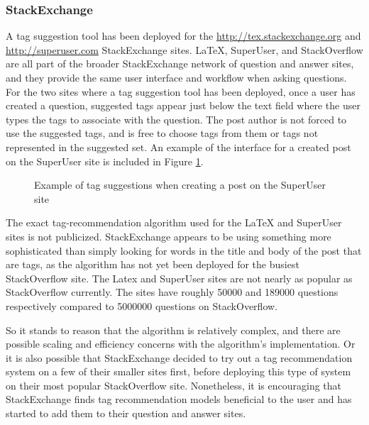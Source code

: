 \documentclass[man,floatsintext,donotrepeattitle]{apa6}
\begin{document}
\subsubsection{StackExchange}

A tag suggestion tool has been deployed for the \url{http://tex.stackexchange.org} \parencite{LatexTags2013} and \url{http://superuser.com} \parencite{SuperUserTags2013} StackExchange sites.
LaTeX, SuperUser, and StackOverflow are all part of the broader StackExchange network of question and answer sites, and they provide the same user interface and workflow when asking questions.
For the two sites where a tag suggestion tool has been deployed, once a user has created a question, suggested tags appear just below the text field where the user types the tags to associate with the question.
The post author is not forced to use the suggested tags, and is free to choose tags from them or tags not represented in the suggested set.
An example of the interface for a created post on the SuperUser site is included in Figure \ref{figSuperUserSuggestion}.

\begin{figure}[!htbp]
  \caption{Example of tag suggestions when creating a post on the SuperUser site}
  \label{figSuperUserSuggestion}
\end{figure}

The exact tag-recommendation algorithm used for the LaTeX and SuperUser sites is not publicized.
StackExchange appears to be using something more sophisticated than simply looking for words in the title and body of the post that are tags, as the algorithm has not yet been deployed for the busiest StackOverflow site.
The Latex and SuperUser sites are not nearly as popular as StackOverflow currently.
The sites have roughly \num{50000} and \num{189000} questions respectively compared to \num{5000000} questions on StackOverflow.

So it stands to reason that the algorithm is relatively complex, and there are possible scaling and efficiency concerns with the algorithm's implementation.
Or it is also possible that StackExchange decided to try out a tag recommendation system on a few of their smaller sites first, before deploying this type of system on their most popular StackOverflow site.
Nonetheless, it is encouraging that StackExchange finds tag recommendation models beneficial to the user and has started to add them to their question and answer sites. 
\end{document}
